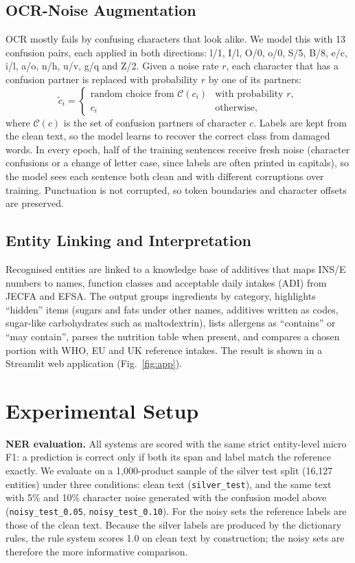 \documentclass[conference]{IEEEtran}
\begin{document}
\subsection{OCR-Noise Augmentation}
OCR mostly fails by confusing characters that look alike. We model this with 13 confusion pairs, each applied in both directions: l/1, I/l, O/0, o/0, S/5, B/8, e/c, i/l, a/o, n/h, u/v, g/q and Z/2. Given a noise rate $r$, each character that has a confusion partner is replaced with probability $r$ by one of its partners:
\begin{equation}
\tilde{c}_i =
\begin{cases}
\text{random choice from } \mathcal{C}(c_i) & \text{with probability } r,\\
c_i & \text{otherwise,}
\end{cases}
\end{equation}
where $\mathcal{C}(c)$ is the set of confusion partners of character $c$. Labels are kept from the clean text, so the model learns to recover the correct class from damaged words. In every epoch, half of the training sentences receive fresh noise (character confusions or a change of letter case, since labels are often printed in capitals), so the model sees each sentence both clean and with different corruptions over training. Punctuation is not corrupted, so token boundaries and character offsets are preserved.

\subsection{Entity Linking and Interpretation}
Recognised entities are linked to a knowledge base of additives that maps INS/E numbers to names, function classes and acceptable daily intakes (ADI) from JECFA and EFSA. The output groups ingredients by category, highlights ``hidden'' items (sugars and fats under other names, additives written as codes, sugar-like carbohydrates such as maltodextrin), lists allergens as ``contains'' or ``may contain'', parses the nutrition table when present, and compares a chosen portion with WHO, EU and UK reference intakes. The result is shown in a Streamlit web application (Fig.~\ref{fig:app}).

\section{Experimental Setup}

\textbf{NER evaluation.} All systems are scored with the same strict entity-level micro F1: a prediction is correct only if both its span and label match the reference exactly. We evaluate on a 1,000-product sample of the silver test split (16,127 entities) under three conditions: clean text (\texttt{silver\_test}), and the same text with 5\% and 10\% character noise generated with the confusion model above (\texttt{noisy\_test\_0.05}, \texttt{noisy\_test\_0.10}). For the noisy sets the reference labels are those of the clean text. Because the silver labels are produced by the dictionary rules, the rule system scores 1.0 on clean text by construction; the noisy sets are therefore the more informative comparison.
\end{document}
